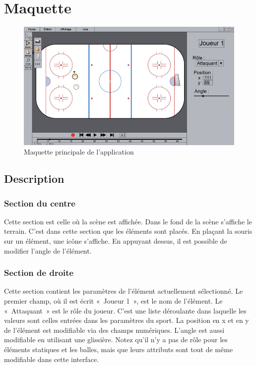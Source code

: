 \chapter{Maquette}
\label{s:mockup}

\begin{figure}[H]
	\centering
	\includegraphics[width=\textwidth]{mockup/mockup.png}
	\caption{Maquette principale de l'application}
	\label{fig:mock-up}
\end{figure}

\section{Description}

\subsection{Section du centre}

Cette section est celle où la scène est affichée. Dans le fond de la scène s'affiche le terrain. C'est dans cette section que les éléments sont placés. En plaçant la souris sur un élément, une icône s'affiche. En appuyant dessus, il est possible de modifier l'angle de l'élément.

\subsection{Section de droite}

Cette section contient les paramètres de l'élément actuellement sélectionné. Le premier champ, où il est écrit «~Joueur 1~», est le nom de l'élément. Le «~Attaquant~» est le rôle du joueur. C'est une liste déroulante dans laquelle les valeurs sont celles entrées dans les paramètres du sport. La position en x et en y de l'élément est modifiable via des champs numériques. L'angle est aussi modifiable en utilisant une glissière. Notez qu'il n'y a pas de rôle pour les éléments statiques et les balles, mais que leurs attributs sont tout de même modifiable dans cette interface.


